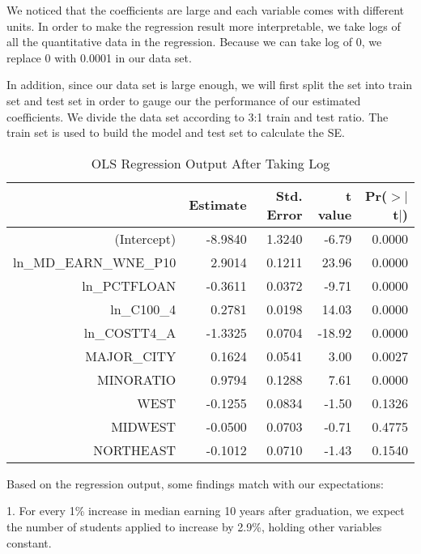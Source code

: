 \documentclass{article}
\begin{document}
We noticed that the coefficients are large and each variable comes with different units. In order to make the regression result more interpretable, we take logs of all the quantitative data in the regression. Because we can take log of 0, we replace 0 with 0.0001 in our data set.

In addition, since our data set is large enough, we will first split the set into train set and test set in order to gauge our the performance of our estimated coefficients. We divide the data set according to 3:1 train and test ratio. The train set is used to build the model and test set to calculate the SE.

\begin{Schunk}
\begin{Soutput}
\begin{table}[ht]
\centering
\begin{tabular}{rrrrr}
  \hline
 & Estimate & Std. Error & t value & Pr($>$$|$t$|$) \\ 
  \hline
(Intercept) & -8.9840 & 1.3240 & -6.79 & 0.0000 \\ 
  ln\_MD\_EARN\_WNE\_P10 & 2.9014 & 0.1211 & 23.96 & 0.0000 \\ 
  ln\_PCTFLOAN & -0.3611 & 0.0372 & -9.71 & 0.0000 \\ 
  ln\_C100\_4 & 0.2781 & 0.0198 & 14.03 & 0.0000 \\ 
  ln\_COSTT4\_A & -1.3325 & 0.0704 & -18.92 & 0.0000 \\ 
  MAJOR\_CITY & 0.1624 & 0.0541 & 3.00 & 0.0027 \\ 
  MINORATIO & 0.9794 & 0.1288 & 7.61 & 0.0000 \\ 
  WEST & -0.1255 & 0.0834 & -1.50 & 0.1326 \\ 
  MIDWEST & -0.0500 & 0.0703 & -0.71 & 0.4775 \\ 
  NORTHEAST & -0.1012 & 0.0710 & -1.43 & 0.1540 \\ 
   \hline
\end{tabular}
\caption{OLS Regression Output After Taking Log} 
\end{table}
\end{Soutput}
\end{Schunk}

Based on the regression output, some findings match with our expectations:

1. For every 1\% increase in median earning 10 years after graduation, we expect the number of students applied to  increase by 2.9\%, holding other variables constant.
\end{document}
